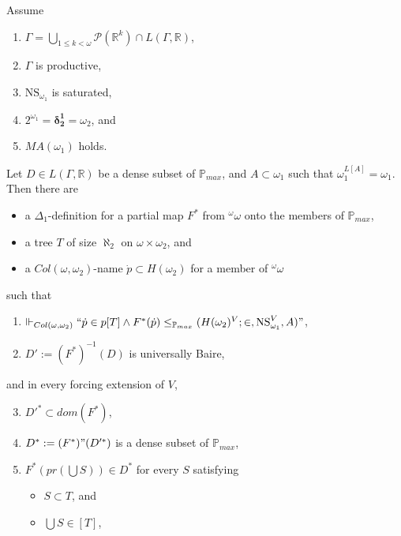 \documentclass[12pt]{article}
\numberwithin{equation}{section}
\begin{document}
\begin{fact}\label{fact434}
Assume
\begin{enumerate}[label=(\roman*), leftmargin=40pt]
    \item $\Gamma  = \bigcup_{1 \leq k < \omega} \mathcal{P}(\mathbb{R}^{k}) \cap L(\Gamma, \mathbb{R})$,
    \item $\Gamma$ is productive,
    \item $\mathrm{NS}_{\omega_1}$ is saturated,
    \item $2^{\omega_1} = \mathbf{\delta^1_2} = \omega_2$, and
    \item $MA(\omega_1)$ holds.
\end{enumerate}
Let $D \in L(\Gamma, \mathbb{R})$ be a dense subset of $\mathbb{P}_{max}$, and $A \subset \omega_1$ such that $\omega_1^{L[A]} = \omega_1$. Then there are
\begin{itemize}
    \item a $\Delta_1$-definition for a partial map $F^*$ from $^{\omega}{\omega}$ onto the members of $\mathbb{P}_{max}$,
    \item a tree $T$ of size $\aleph_2$ on $\omega \times \omega_2$, and
    \item a $Col(\omega, \omega_2)$-name $\dot{p} \subset H(\omega_2)$ for a member of ${^{\omega}{\omega}}$
\end{itemize}
such that 
\begin{enumerate}[label=(4.34.\arabic*), leftmargin=50pt]
    \item\label{4341} $\Vdash_{Col(\omega, \omega_2)} ``\dot{p} \in p[T] \wedge F^*(\dot{p}) \leq_{\mathbb{P}_{max}} (H(\omega_2)^V; \in, \mathrm{NS}_{\omega_1}^V, A)"$,
    \item\label{4342} $D' := (F^*)^{-1}(D)$ is universally Baire, 
\end{enumerate}
and in every forcing extension of $V$,
\begin{enumerate}[label=(4.34.\arabic*), leftmargin=50pt]
    \setcounter{enumi}{2}
    \item\label{4343} $D'^* \subset dom(F^*)$,
    \item\label{4344} $D^* := (F^*) " (D'^*)$ is a dense subset of $\mathbb{P}_{max}$, 
    \item\label{4345} $F^*(pr(\bigcup S)) \in D^*$ for every $S$ satisfying
    \begin{itemize}
        \item $S \subset T$, and
        \item $\bigcup S \in [T]$, 
    \end{itemize}

\end{enumerate}
\end{fact}
\end{document}

